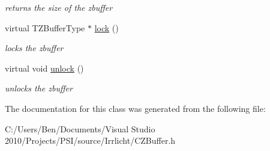 \begin{DoxyCompactItemize}
\begin{DoxyCompactList}\small\item\em returns the size of the zbuffer \end{DoxyCompactList}\item 
\hypertarget{classirr_1_1video_1_1_c_z_buffer_a06dd3bc591e766edd3717fda294b7158}{virtual T\-Z\-Buffer\-Type $\ast$ \hyperlink{classirr_1_1video_1_1_c_z_buffer_a06dd3bc591e766edd3717fda294b7158}{lock} ()}\label{classirr_1_1video_1_1_c_z_buffer_a06dd3bc591e766edd3717fda294b7158}

\begin{DoxyCompactList}\small\item\em locks the zbuffer \end{DoxyCompactList}\item 
\hypertarget{classirr_1_1video_1_1_c_z_buffer_a2560ee35b520c66de871032dd92c7eba}{virtual void \hyperlink{classirr_1_1video_1_1_c_z_buffer_a2560ee35b520c66de871032dd92c7eba}{unlock} ()}\label{classirr_1_1video_1_1_c_z_buffer_a2560ee35b520c66de871032dd92c7eba}

\begin{DoxyCompactList}\small\item\em unlocks the zbuffer \end{DoxyCompactList}\end{DoxyCompactItemize}


The documentation for this class was generated from the following file\-:\begin{DoxyCompactItemize}
\item 
C\-:/\-Users/\-Ben/\-Documents/\-Visual Studio 2010/\-Projects/\-P\-S\-I/source/\-Irrlicht/C\-Z\-Buffer.\-h\end{DoxyCompactItemize}
